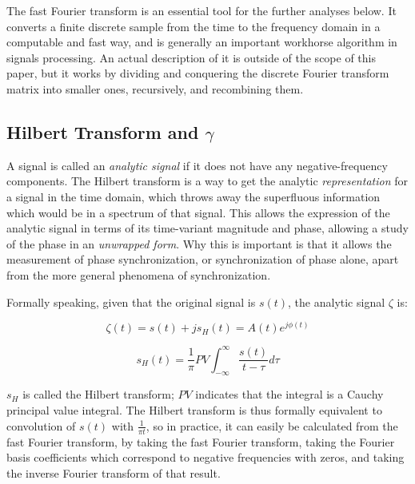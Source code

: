 \documentclass[12pt]{article}
\begin{document}
The fast Fourier transform\cite{fft} is an essential tool for the further analyses below. It converts a finite discrete sample from the time to the frequency domain in a computable and fast way, and is generally an important workhorse algorithm in signals processing. An actual description of it is outside of the scope of this paper, but it works by dividing and conquering the discrete Fourier transform matrix into smaller ones, recursively, and recombining them.

\subsection{Hilbert Transform and $\gamma$}

A signal is called an \emph{analytic signal} if it does not have any negative-frequency components. The Hilbert transform is a way to get the analytic \emph{representation} for a signal in the time domain, which throws away the superfluous information which would be in a spectrum of that signal. This allows the expression of the analytic signal in terms of its time-variant magnitude and phase, allowing a study of the phase in an \emph{unwrapped form}\cite{gabor}. Why this is important is that it allows the measurement of phase synchronization, or synchronization of phase alone, apart from the more general phenomena of synchronization.

Formally speaking, given that the original signal is $s(t)$, the analytic signal $\zeta$ is:

$$\zeta(t) = s(t) + js_H(t) = A(t)e^{j\phi(t)}$$

$$s_H(t) = \frac{1}{\pi} PV \int_{-\infty}^{\infty} \frac{s(t)}{t - \tau} d\tau$$

$s_H$ is called the Hilbert transform; $PV$ indicates that the integral is a Cauchy principal value integral. The Hilbert transform is thus formally equivalent to convolution of $s(t)$ with $\frac{1}{\pi t}$, so in practice, it can easily be calculated from the fast Fourier transform, by taking the fast Fourier transform, taking the Fourier basis coefficients which correspond to negative frequencies with zeros, and taking the inverse Fourier transform of that result.\cite{hilbert}
\end{document}
